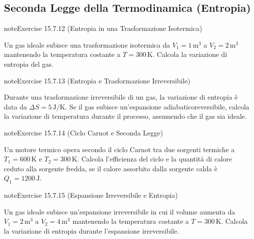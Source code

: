 \documentclass[letterpaper,10pt,italian]{jupyterBook}
\begin{document}
\subsection{Seconda Legge della Termodinamica (Entropia)}
\label{\detokenize{ch/thermodynamics/principles-problems:seconda-legge-della-termodinamica-entropia}} \label{exercise:ch/thermodynamics/principles-problems-exercise-11}

\begin{sphinxadmonition}{note}{Exercise 15.7.12 (Entropia in una Trasformazione Isotermica)}



\sphinxAtStartPar
Un gas ideale subisce una trasformazione isotermica da \(V_1 = 1 \, \text{m}^3\) a \(V_2 = 2 \, \text{m}^3\) mantenendo la temperatura costante a \(T = 300 \, \text{K}\). Calcola la variazione di entropia del gas.
\end{sphinxadmonition}
 \label{exercise:ch/thermodynamics/principles-problems-exercise-12}

\begin{sphinxadmonition}{note}{Exercise 15.7.13 (Entropia e Trasformazione Irreversibile)}



\sphinxAtStartPar
Durante una trasformazione irreversibile di un gas, la variazione di entropia è data da \(\Delta S = 5 \, \text{J/K}\). Se il gas subisce un’espansione adiabatico\sphinxhyphen{}reversibile, calcola la variazione di temperatura durante il processo, assumendo che il gas sia ideale.
\end{sphinxadmonition}
 \label{exercise:ch/thermodynamics/principles-problems-exercise-13}

\begin{sphinxadmonition}{note}{Exercise 15.7.14 (Ciclo Carnot e Seconda Legge)}



\sphinxAtStartPar
Un motore termico opera secondo il ciclo Carnot tra due sorgenti termiche a \(T_1 = 600 \, \text{K}\) e \(T_2 = 300 \, \text{K}\). Calcola l’efficienza del ciclo e la quantità di calore ceduto alla sorgente fredda, se il calore assorbito dalla sorgente calda è \(Q_1 = 1200 \, \text{J}\).
\end{sphinxadmonition}
 \label{exercise:ch/thermodynamics/principles-problems-exercise-14}

\begin{sphinxadmonition}{note}{Exercise 15.7.15 (Espansione Irreversibile e Entropia)}



\sphinxAtStartPar
Un gas ideale subisce un’espansione irreversibile in cui il volume aumenta da \(V_1 = 2 \, \text{m}^3\) a \(V_2 = 4 \, \text{m}^3\) mantenendo la temperatura costante a \(T = 300 \, \text{K}\). Calcola la variazione di entropia durante l’espansione irreversibile.
\end{sphinxadmonition}
 \label{exercise:ch/thermodynamics/principles-problems-exercise-15}
\end{document}
